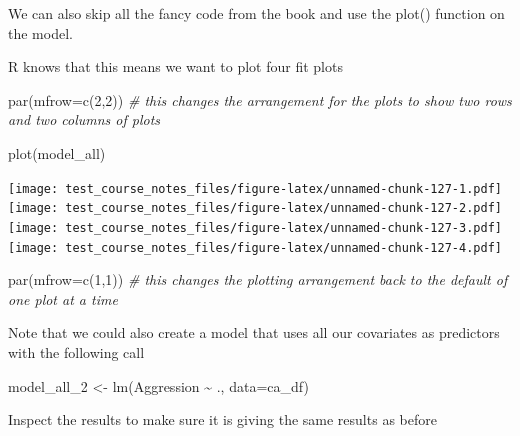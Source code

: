 \documentclass[
]{book}
\newenvironment{Shaded}{\begin{snugshade}}{\end{snugshade}}
\newcommand{\AttributeTok}[1]{\textcolor[rgb]{0.77,0.63,0.00}{#1}}
\newcommand{\CommentTok}[1]{\textcolor[rgb]{0.56,0.35,0.01}{\textit{#1}}}
\newcommand{\DecValTok}[1]{\textcolor[rgb]{0.00,0.00,0.81}{#1}}
\newcommand{\FunctionTok}[1]{\textcolor[rgb]{0.00,0.00,0.00}{#1}}
\newcommand{\NormalTok}[1]{#1}
\newcommand{\OtherTok}[1]{\textcolor[rgb]{0.56,0.35,0.01}{#1}}
\newcommand{\SpecialCharTok}[1]{\textcolor[rgb]{0.00,0.00,0.00}{#1}}
\begin{document}
We can also skip all the fancy code from the book and use the plot() function on the model.

R knows that this means we want to plot four fit plots

\begin{Shaded}
\begin{Highlighting}[]
\FunctionTok{par}\NormalTok{(}\AttributeTok{mfrow=}\FunctionTok{c}\NormalTok{(}\DecValTok{2}\NormalTok{,}\DecValTok{2}\NormalTok{)) }\CommentTok{\# this changes the arrangement for the plots to show two rows and two columns of plots}
\end{Highlighting}
\end{Shaded}

\begin{Shaded}
\begin{Highlighting}[]
\FunctionTok{plot}\NormalTok{(model\_all)}
\end{Highlighting}
\end{Shaded}

\texttt{[image: test\_course\_notes\_files/figure-latex/unnamed-chunk-127-1.pdf]} \texttt{[image: test\_course\_notes\_files/figure-latex/unnamed-chunk-127-2.pdf]} \texttt{[image: test\_course\_notes\_files/figure-latex/unnamed-chunk-127-3.pdf]} \texttt{[image: test\_course\_notes\_files/figure-latex/unnamed-chunk-127-4.pdf]}

\begin{Shaded}
\begin{Highlighting}[]
\FunctionTok{par}\NormalTok{(}\AttributeTok{mfrow=}\FunctionTok{c}\NormalTok{(}\DecValTok{1}\NormalTok{,}\DecValTok{1}\NormalTok{)) }\CommentTok{\# this changes the plotting arrangement back to the default of one plot at a time}
\end{Highlighting}
\end{Shaded}

Note that we could also create a model that uses all our covariates as predictors with the following call

\begin{Shaded}
\begin{Highlighting}[]
\NormalTok{model\_all\_2 }\OtherTok{\textless{}{-}} \FunctionTok{lm}\NormalTok{(Aggression }\SpecialCharTok{\textasciitilde{}}\NormalTok{ ., }\AttributeTok{data=}\NormalTok{ca\_df)}
\end{Highlighting}
\end{Shaded}

Inspect the results to make sure it is giving the same results as before
\end{document}

